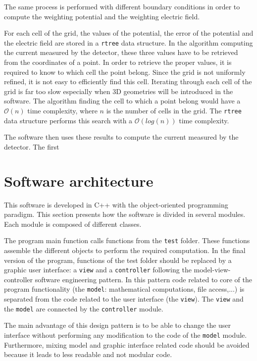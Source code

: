 \documentclass[11pt]{article}
\begin{document}
The same process is performed with different boundary conditions in order
to compute the weighting potential and the weighting electric field.

For each cell of the grid, the values of the potential, the error of the
potential and the electric field are stored in a \texttt{rtree} data structure.
In the algorithm computing the current measured by the detector, these three
values have to be retrieved from the coordinates of a point. In order to retrieve the proper
values, it is required to know to which cell the point belong. Since the grid
is not uniformly refined, it is not easy to efficiently find this cell.
Iterating through each cell of the grid is far too slow especially when 3D
geometries will be introduced in the software. The algorithm finding the cell
to which a point belong would have a $\mathcal{O}(n)$ time complexity, where $n$
is the number of cells in the grid. The \texttt{rtree} data structure
performs this search with a $\mathcal{O}(log(n))$ time complexity.

The software then uses these results to compute the current measured by the
detector. The first

\section{Software architecture}

This software is developed in C++ with the object-oriented programming paradigm.
This section presents how the software is divided in several modules. Each module
is composed of different classes.

The program main function calls functions from the \texttt{test} folder. These functions
assemble the different objects to perform the required computation. In the
final version of the program, functions of the test folder should be replaced
by a graphic user interface: a \texttt{view} and a \texttt{controller} following
the model-view-controller software engineering pattern. In this pattern code
related to core of the program functionality (the \texttt{model}: mathematical computations, file access,...)
is separated from the code related to the user interface (the \texttt{view}).
The \texttt{view} and the
\texttt{model} are connected by the \texttt{controller} module.

The main advantage of this design pattern is to be able to change the user interface without
performing any modification to the code of the \texttt{model} module. Furthermore,
mixing model and graphic interface related code should be avoided because it leads to
less readable and not modular code.
\end{document}
